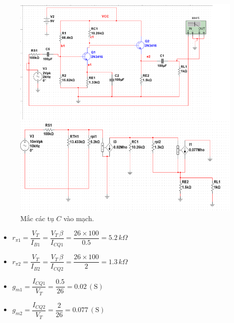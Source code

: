 \begin{figure}[H]
	\centering
	\includegraphics[width=.8\linewidth]{./my-chapters/my-images/Question9/d_de.png}
	\caption{Mắc các tụ $C$ vào mạch.}
\end{figure}

\begin{itemize}[label=+, leftmargin=2cm]
	\item \( r_{\pi1} = \dfrac{V_T}{I_{B1}} = \dfrac{V_T \, \beta}{I_{CQ1}} 
	= \dfrac{26 \times 100}{0.5} = 5.2\,k\Omega \)
	
	\item \( r_{\pi2} = \dfrac{V_T}{I_{B2}} = \dfrac{V_T \, \beta}{I_{CQ2}} 
	= \dfrac{26 \times 100}{2} = 1.3\,k\Omega \)
	
	\item \( g_{m1} = \dfrac{I_{CQ1}}{V_T} = \dfrac{0.5}{26} = 0.02\,(\text{S}) \)
	
	\item \( g_{m2} = \dfrac{I_{CQ2}}{V_T} = \dfrac{2}{26} = 0.077\,(\text{S}) \)
\end{itemize}

